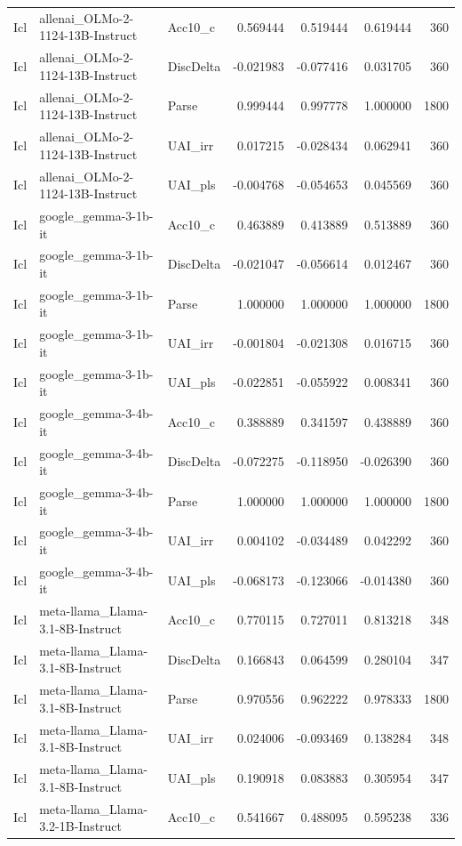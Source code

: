 \begin{tabular}{lllrrrr}
Icl & allenai_OLMo-2-1124-13B-Instruct & Acc10_c & 0.569444 & 0.519444 & 0.619444 & 360 \\
Icl & allenai_OLMo-2-1124-13B-Instruct & DiscDelta & -0.021983 & -0.077416 & 0.031705 & 360 \\
Icl & allenai_OLMo-2-1124-13B-Instruct & Parse & 0.999444 & 0.997778 & 1.000000 & 1800 \\
Icl & allenai_OLMo-2-1124-13B-Instruct & UAI_irr & 0.017215 & -0.028434 & 0.062941 & 360 \\
Icl & allenai_OLMo-2-1124-13B-Instruct & UAI_pls & -0.004768 & -0.054653 & 0.045569 & 360 \\
Icl & google_gemma-3-1b-it & Acc10_c & 0.463889 & 0.413889 & 0.513889 & 360 \\
Icl & google_gemma-3-1b-it & DiscDelta & -0.021047 & -0.056614 & 0.012467 & 360 \\
Icl & google_gemma-3-1b-it & Parse & 1.000000 & 1.000000 & 1.000000 & 1800 \\
Icl & google_gemma-3-1b-it & UAI_irr & -0.001804 & -0.021308 & 0.016715 & 360 \\
Icl & google_gemma-3-1b-it & UAI_pls & -0.022851 & -0.055922 & 0.008341 & 360 \\
Icl & google_gemma-3-4b-it & Acc10_c & 0.388889 & 0.341597 & 0.438889 & 360 \\
Icl & google_gemma-3-4b-it & DiscDelta & -0.072275 & -0.118950 & -0.026390 & 360 \\
Icl & google_gemma-3-4b-it & Parse & 1.000000 & 1.000000 & 1.000000 & 1800 \\
Icl & google_gemma-3-4b-it & UAI_irr & 0.004102 & -0.034489 & 0.042292 & 360 \\
Icl & google_gemma-3-4b-it & UAI_pls & -0.068173 & -0.123066 & -0.014380 & 360 \\
Icl & meta-llama_Llama-3.1-8B-Instruct & Acc10_c & 0.770115 & 0.727011 & 0.813218 & 348 \\
Icl & meta-llama_Llama-3.1-8B-Instruct & DiscDelta & 0.166843 & 0.064599 & 0.280104 & 347 \\
Icl & meta-llama_Llama-3.1-8B-Instruct & Parse & 0.970556 & 0.962222 & 0.978333 & 1800 \\
Icl & meta-llama_Llama-3.1-8B-Instruct & UAI_irr & 0.024006 & -0.093469 & 0.138284 & 348 \\
Icl & meta-llama_Llama-3.1-8B-Instruct & UAI_pls & 0.190918 & 0.083883 & 0.305954 & 347 \\
Icl & meta-llama_Llama-3.2-1B-Instruct & Acc10_c & 0.541667 & 0.488095 & 0.595238 & 336 \\

\end{tabular}
